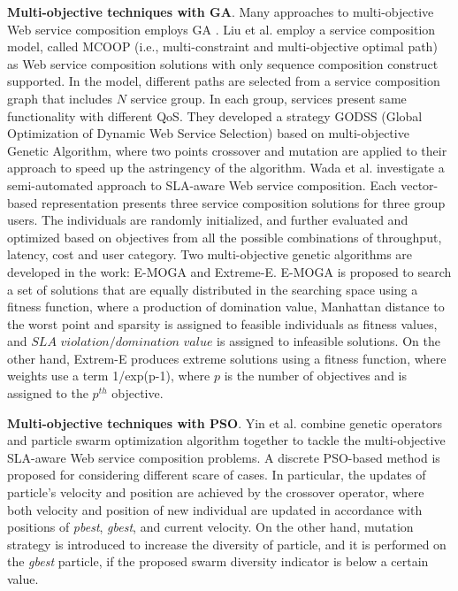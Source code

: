 \textbf{Multi-objective techniques with GA}. Many approaches to multi-objective Web service composition employs GA \cite{liu2005dynamic}. Liu et al. \cite{liu2005dynamic} employ a service composition model, called  MCOOP (i.e., multi-constraint and multi-objective optimal path) as Web service composition solutions with only sequence composition construct supported. In the model, different paths are selected from a service composition graph that includes $N$ service group. In each group, services present same functionality with different QoS. They developed a strategy GODSS (Global Optimization of Dynamic Web Service Selection) based on multi-objective Genetic Algorithm, where two points crossover and mutation are applied to their approach to speed up the astringency of the algorithm. Wada et al. \cite{wada2012e3} investigate a semi-automated approach to SLA-aware Web service composition.  Each vector-based representation presents three service composition solutions for three group users.  The individuals are randomly initialized, and further evaluated and optimized based on objectives from all the possible combinations of throughput, latency, cost and user category. Two multi-objective genetic algorithms are developed in the work: E-MOGA and Extreme-E. E-MOGA is proposed to search a set of solutions that are equally distributed in the searching space using a fitness function, where a production of domination value,  Manhattan distance to the worst point and sparsity is assigned to feasible individuals as fitness values, and $SLA$ $violation /domination$ $value$ is assigned to infeasible solutions. On the other hand, Extrem-E produces extreme solutions using a fitness function, where weights use a term 1/exp(p-1), where $p$ is the number of objectives and is assigned to the $p^{th}$ objective.

\textbf{Multi-objective techniques with PSO}. Yin et al.  \cite{yin2014hybrid} combine genetic operators and particle swarm optimization algorithm together to tackle the multi-objective SLA-aware Web service composition problems. A discrete PSO-based method is proposed for  considering different scare of cases. In particular, the updates of particle's velocity and position are achieved by the crossover operator, where both velocity and position of new individual are updated in accordance with positions of \textit{pbest}, \textit{gbest}, and current velocity. On the other hand, mutation strategy is introduced to increase the diversity of particle, and it is performed on the \textit{gbest} particle, if the proposed swarm diversity indicator is below a certain value.

